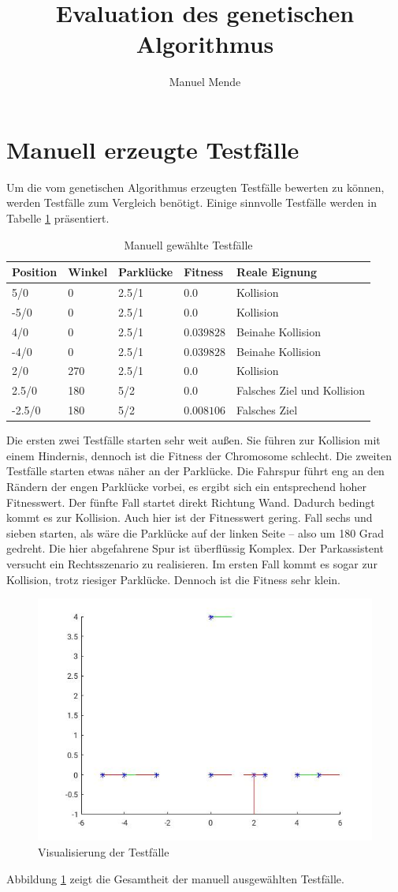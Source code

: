 \documentclass[12pt,a4paper]{article}
\author{Manuel Mende}
\title{Evaluation des genetischen Algorithmus}
\begin{document}
\maketitle
\section{Manuell erzeugte Testfälle}
Um die vom genetischen Algorithmus erzeugten Testfälle bewerten zu können, werden Testfälle zum Vergleich benötigt. Einige sinnvolle Testfälle werden in Tabelle \ref{tab:testfaelle} präsentiert.
\begin{table}\centering
\begin{tabular}{l|l|l|l|l}
Position & Winkel & Parklücke & Fitness & Reale Eignung \\\hline
5/0 & 0 & 2.5/1 & $0.0$ & Kollision \\\hline
-5/0 & 0 & 2.5/1 & $0.0$ & Kollision \\\hline
4/0 & 0 & 2.5/1 & $0.039828$ & Beinahe Kollision\\\hline
-4/0 & 0 & 2.5/1 & $0.039828$ & Beinahe Kollision\\\hline
2/0 & 270 & 2.5/1 & $0.0$ & Kollision \\\hline
2.5/0 & 180 & 5/2 & $0.0$ & Falsches Ziel und Kollision \\\hline
-2.5/0 & 180 & 5/2 & $0.008106$ & Falsches Ziel \\
\end{tabular}
\caption{Manuell gewählte Testfälle}
\label{tab:testfaelle}
\end{table}
Die ersten zwei Testfälle starten sehr weit außen. Sie führen zur Kollision mit einem Hindernis, dennoch ist die Fitness der Chromosome schlecht. Die zweiten Testfälle starten etwas näher an der Parklücke. Die Fahrspur führt eng an den Rändern der engen Parklücke vorbei, es ergibt sich ein entsprechend hoher Fitnesswert. Der fünfte Fall startet direkt Richtung Wand. Dadurch bedingt kommt es zur Kollision. Auch hier ist der Fitnesswert gering. Fall sechs und sieben starten, als wäre die Parklücke auf der linken Seite -- also um 180 Grad gedreht. Die hier abgefahrene Spur ist überflüssig Komplex. Der Parkassistent versucht ein Rechtsszenario zu realisieren. Im ersten Fall kommt es sogar zur Kollision, trotz riesiger Parklücke. Dennoch ist die Fitness sehr klein.
\begin{figure}\centering
\includegraphics[width=.6\textwidth]{myTestcases.jpg}
\caption{Visualisierung der Testfälle}
\label{fig:testcases}
\end{figure}
Abbildung \ref{fig:testcases} zeigt die Gesamtheit der manuell ausgewählten Testfälle.
\end{document}
